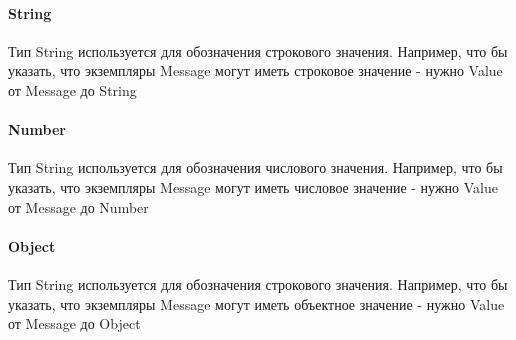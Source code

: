 \paragraph*{String}\hypertarget{Core.String.Description}{}
Тип String используется для обозначения строкового значения. Например, что бы указать, что экземпляры Message могут иметь строковое значение - нужно Value от Message до String  
\paragraph*{Number}\hypertarget{Core.Number.Description}{}
Тип String используется для обозначения числового значения. Например, что бы указать, что экземпляры Message могут иметь числовое значение - нужно Value от Message до Number  
\paragraph*{Object}\hypertarget{Core.Object.Description}{}
Тип String используется для обозначения строкового значения. Например, что бы указать, что экземпляры Message могут иметь объектное значение - нужно Value от Message до Object
